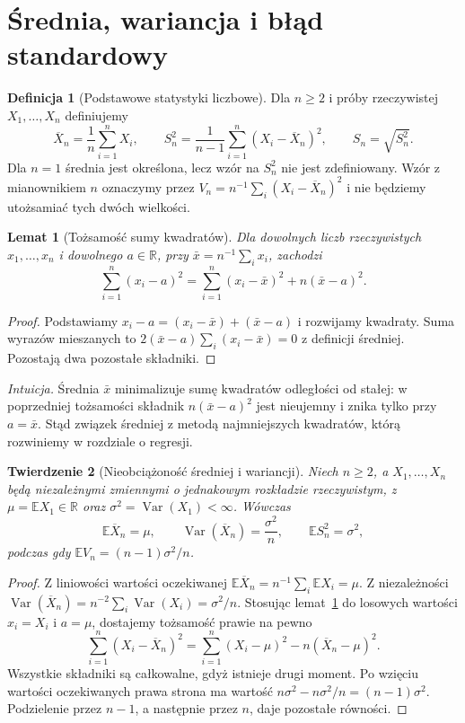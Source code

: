 \documentclass[11pt,a4paper,oneside]{report}
\numberwithin{equation}{chapter}
\theoremstyle{plain}
\newtheorem{twierdzenie}{Twierdzenie}[chapter]
\newtheorem{lemat}[twierdzenie]{Lemat}
\theoremstyle{definition}
\newtheorem{definicja}{Definicja}[chapter]
\theoremstyle{remark}
\newcommand{\R}{\mathbb R}
\newcommand{\E}{\mathbb E}
\newcommand{\Var}{\operatorname{Var}}
\begin{document}
\section{Średnia, wariancja i błąd standardowy}
\begin{definicja}[Podstawowe statystyki liczbowe]\label{def:meanvar}
Dla $n\ge2$ i próby rzeczywistej $X_1,\ldots,X_n$ definiujemy
\[
\overline X_n=\frac1n\sum_{i=1}^nX_i,\qquad
S_n^2=\frac1{n-1}\sum_{i=1}^n(X_i-\overline X_n)^2,\qquad S_n=\sqrt{S_n^2}.
\]
Dla $n=1$ średnia jest określona, lecz wzór na $S_n^2$ nie jest zdefiniowany. Wzór z mianownikiem $n$ oznaczymy przez $V_n=n^{-1}\sum_i(X_i-\overline X_n)^2$ i nie będziemy utożsamiać tych dwóch wielkości.
\end{definicja}

\begin{lemat}[Tożsamość sumy kwadratów]\label{lem:sum-of-squares}
Dla dowolnych liczb rzeczywistych $x_1,\ldots,x_n$ i dowolnego $a\in\R$, przy $\bar x=n^{-1}\sum_i x_i$, zachodzi
\[
\sum_{i=1}^n(x_i-a)^2
=\sum_{i=1}^n(x_i-\bar x)^2+n(\bar x-a)^2.
\]
\end{lemat}
\begin{proof}
Podstawiamy $x_i-a=(x_i-\bar x)+(\bar x-a)$ i rozwijamy kwadraty. Suma wyrazów mieszanych to $2(\bar x-a)\sum_i(x_i-\bar x)=0$ z definicji średniej. Pozostają dwa pozostałe składniki.
\end{proof}

\emph{Intuicja.} Średnia $\bar x$ minimalizuje sumę kwadratów odległości od stałej: w poprzedniej tożsamości składnik $n(\bar x-a)^2$ jest nieujemny i znika tylko przy $a=\bar x$. Stąd związek średniej z metodą najmniejszych kwadratów, którą rozwiniemy w rozdziale o regresji.

\begin{twierdzenie}[Nieobciążoność średniej i wariancji]\label{thm:unbiased-variance}
Niech $n\ge2$, a $X_1,\ldots,X_n$ będą niezależnymi zmiennymi o jednakowym rozkładzie rzeczywistym, z $\mu=\E X_1\in\R$ oraz $\sigma^2=\Var(X_1)<\infty$. Wówczas
\[
\E\overline X_n=\mu,\qquad
\Var(\overline X_n)=\frac{\sigma^2}{n},\qquad
\E S_n^2=\sigma^2,
\]
podczas gdy $\E V_n=(n-1)\sigma^2/n$.
\end{twierdzenie}
\begin{proof}
Z liniowości wartości oczekiwanej $\E\overline X_n=n^{-1}\sum_i\E X_i=\mu$. Z niezależności $\Var(\overline X_n)=n^{-2}\sum_i\Var(X_i)=\sigma^2/n$. Stosując lemat~\ref{lem:sum-of-squares} do losowych wartości $x_i=X_i$ i $a=\mu$, dostajemy tożsamość prawie na pewno
\[
\sum_{i=1}^n(X_i-\overline X_n)^2
=\sum_{i=1}^n(X_i-\mu)^2-n(\overline X_n-\mu)^2.
\]
Wszystkie składniki są całkowalne, gdyż istnieje drugi moment. Po wzięciu wartości oczekiwanych prawa strona ma wartość $n\sigma^2-n\sigma^2/n=(n-1)\sigma^2$. Podzielenie przez $n-1$, a następnie przez $n$, daje pozostałe równości.
\end{proof}
\end{document}
